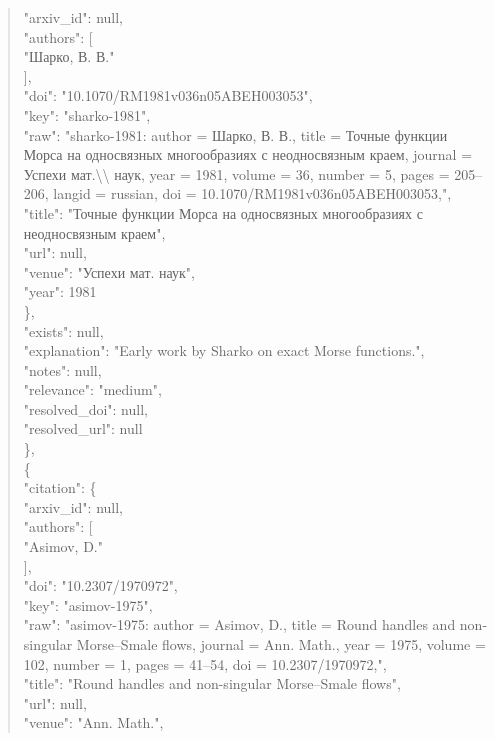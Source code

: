 \documentclass[11pt]{article}
\begin{document}
\begin{quote}
        "arxiv\_id": null,\\
        "authors": [\\
          "Шарко, В. В."\\
        ],\\
        "doi": "10.1070/RM1981v036n05ABEH003053",\\
        "key": "sharko-1981",\\
        "raw": "sharko-1981: author = Шарко, В. В., title = Точные функции Морса на односвязных многообразиях с неодносвязным краем, journal = Успехи мат.\textbackslash{}\textbackslash{} наук, year = 1981, volume = 36, number = 5, pages = 205--206, langid = russian, doi = 10.1070/RM1981v036n05ABEH003053,",\\
        "title": "Точные функции Морса на односвязных многообразиях с неодносвязным краем",\\
        "url": null,\\
        "venue": "Успехи мат. наук",\\
        "year": 1981\\
      \},\\
      "exists": null,\\
      "explanation": "Early work by Sharko on exact Morse functions.",\\
      "notes": null,\\
      "relevance": "medium",\\
      "resolved\_doi": null,\\
      "resolved\_url": null\\
    \},\\
    \{\\
      "citation": \{\\
        "arxiv\_id": null,\\
        "authors": [\\
          "Asimov, D."\\
        ],\\
        "doi": "10.2307/1970972",\\
        "key": "asimov-1975",\\
        "raw": "asimov-1975: author = Asimov, D., title = Round handles and non-singular Morse--Smale flows, journal = Ann. Math., year = 1975, volume = 102, number = 1, pages = 41--54, doi = 10.2307/1970972,",\\
        "title": "Round handles and non-singular Morse--Smale flows",\\
        "url": null,\\
        "venue": "Ann. Math.",\\

\end{quote}
\end{document}
